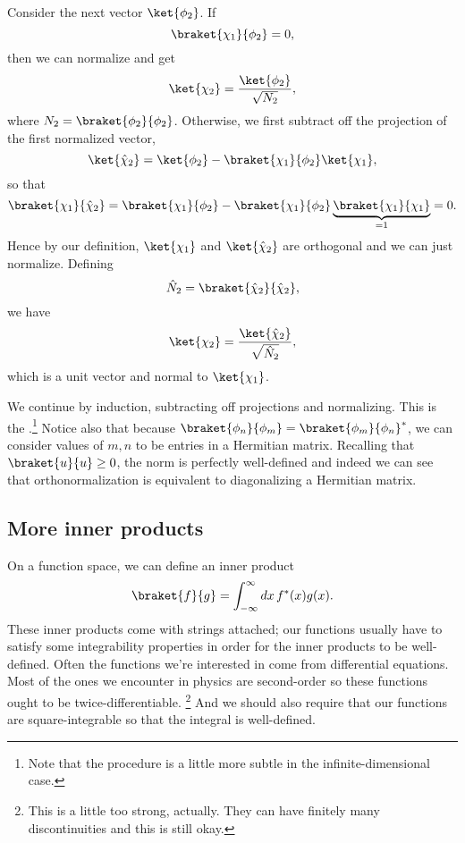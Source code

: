 Consider the next vector $\ket{\phi_2}$. If
\begin{equation}
    \braket{\chi_1}{\phi_2}=0,
\end{equation}
then we can normalize and get
\begin{equation}
    \ket{\chi_2}=\frac{\ket{\phi_2}}{\sqrt{N_2}},
\end{equation}
where $N_2=\braket{\phi_2}{\phi_2}$. Otherwise, we first subtract off the projection of the first normalized vector,
\begin{equation}
    \ket{\hat\chi_2}=\ket{\phi_2}-\braket{\chi_1}{\phi_2} \ket{\chi_1},
\end{equation}
so that
\begin{equation}
    \braket{\chi_1}{\hat \chi_2} = \braket{\chi_1}{\phi_2} -\braket{\chi_1}{\phi_2} \underbrace{\braket{\chi_1}{\chi_1}}_{=1} = 0.
\end{equation}
Hence by our definition, $\ket{\chi_1}$ and $\ket{\hat\chi_2}$ are orthogonal and we can just normalize. Defining
\begin{equation}
    \hat N_2 = \braket{\hat \chi_2}{\hat \chi_2},
\end{equation}
we have
\begin{equation}
    \ket{\chi_2}=\frac{\ket{\hat \chi_2}}{\sqrt{\hat N_2}},
\end{equation}
which is a unit vector and normal to $\ket{\chi_1}$.

We continue by induction, subtracting off projections and normalizing. This is the .\footnote{Note that the procedure is a little more subtle in the infinite-dimensional case.} Notice also that because $\braket{\phi_n}{\phi_m}=\braket{\phi_m}{\phi_n}^*$, we can consider values of $m,n$ to be entries in a Hermitian matrix. Recalling that $\braket{u}{u}\geq 0$, the norm is perfectly well-defined and indeed we can see that orthonormalization is equivalent to diagonalizing a Hermitian matrix.

\subsection*{More inner products}
On a function space, we can define an inner product
\begin{equation}
    \braket{f}{g}=\int_{-\infty}^\infty dx\, f^*(x) g(x).
\end{equation}
These inner products come with strings attached; our functions usually have to satisfy some integrability properties in order for the inner products to be well-defined. Often the functions we're interested in come from differential equations. Most of the ones we encounter in physics are second-order so these functions ought to be twice-differentiable.%
    \footnote{This is a little too strong, actually. They can have finitely many discontinuities and this is still okay.}
And we should also require that our functions are square-integrable so that the integral is well-defined.

